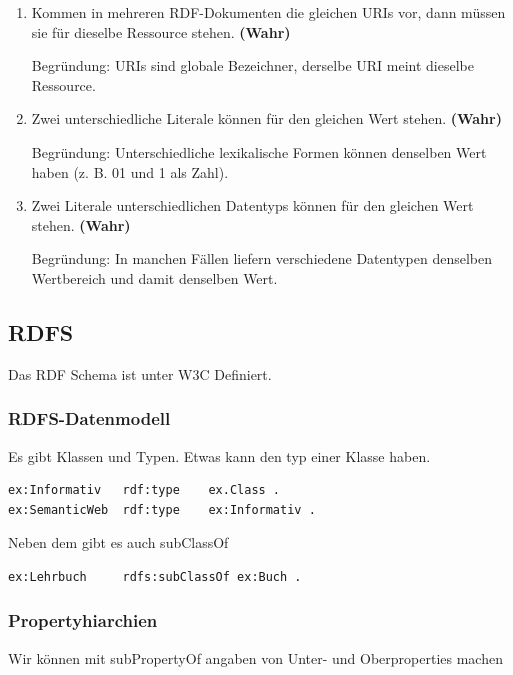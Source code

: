 \documentclass[a4paper]{article}
\begin{document}
\begin{enumerate}
    \item Kommen in mehreren RDF-Dokumenten die gleichen URIs vor, dann müssen sie für
    dieselbe Ressource stehen. \textbf{(Wahr)}

    Begründung: URIs sind globale Bezeichner, derselbe URI meint dieselbe Ressource.


    \item Zwei unterschiedliche Literale können für den gleichen Wert stehen. \textbf{(Wahr)}

    Begründung: Unterschiedliche lexikalische Formen können denselben Wert haben (z. B. 01 und 1 als Zahl).


    \item Zwei Literale unterschiedlichen Datentyps können für den gleichen Wert stehen. \textbf{(Wahr)}

    Begründung: In manchen Fällen liefern verschiedene Datentypen denselben Wertbereich und damit denselben Wert.
\end{enumerate}

\subsection{RDFS}

Das RDF Schema ist unter W3C Definiert.


\subsubsection{RDFS-Datenmodell}

Es gibt Klassen und Typen. Etwas kann den typ einer Klasse haben.

\begin{lstlisting}
ex:Informativ   rdf:type    ex.Class .
ex:SemanticWeb  rdf:type    ex:Informativ .
\end{lstlisting}

Neben dem gibt es auch subClassOf

\begin{lstlisting}
ex:Lehrbuch     rdfs:subClassOf ex:Buch .
\end{lstlisting}

\subsubsection{Propertyhiarchien}

Wir können mit subPropertyOf angaben von Unter- und Oberproperties machen
\end{document}
